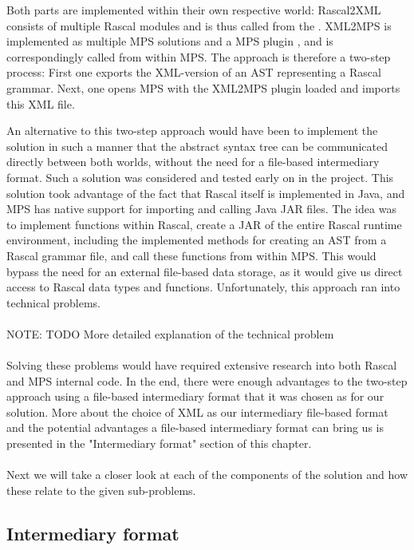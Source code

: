 \documentclass[a4paper]{article}
\begin{document}
Both parts are implemented within their own respective world: Rascal2XML consists of multiple Rascal modules and is thus called from the  . XML2MPS is implemented as multiple MPS solutions and a MPS plugin , and is correspondingly called from within MPS. The approach is therefore a two-step process: First one exports the XML-version of an AST representing a Rascal grammar. Next, one opens MPS with the XML2MPS plugin loaded and imports this XML file.

 
An alternative to this two-step approach would have been to implement the solution in such a manner that the abstract syntax tree can be communicated directly between both worlds, without the need for a file-based intermediary format. Such a solution was considered and tested early on in the project. This solution took advantage of the fact that Rascal itself is implemented in Java, and MPS has native support for importing and calling Java JAR files. The idea was to implement functions within Rascal, create a JAR of the entire Rascal runtime environment, including the implemented methods for creating an AST from a Rascal grammar file, and call these functions from within MPS. This would bypass the need for an external file-based data storage, as it would give us direct access to Rascal data types and functions. Unfortunately, this approach ran into technical problems.
\\\\
NOTE: TODO More detailed explanation of the technical problem 
\\\\
Solving these problems would have required extensive research into both Rascal and MPS internal code. In the end, there were enough advantages to the two-step approach using a file-based intermediary format that it was chosen as for our solution. More about the choice of XML as our intermediary file-based format and the potential advantages a file-based intermediary format can bring us is presented in the "Intermediary format" section of this chapter.
\\\\
Next we will take a closer look at each of the components of the solution and how these relate to the given sub-problems.
\subsection{Intermediary format}
\end{document}
